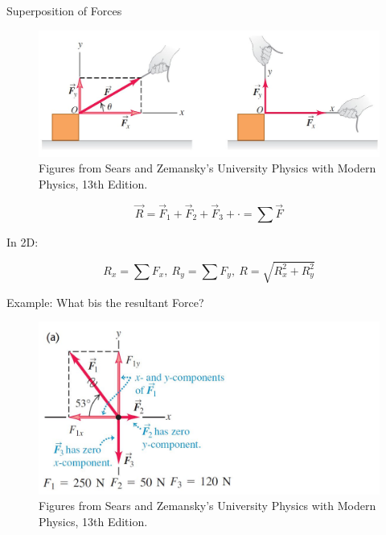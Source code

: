 \documentclass[]{beamer}
\begin{document}




\begin{frame}

 Superposition of Forces
   
      
 \begin{figure}[h!]  
  \includegraphics[width=1.\textwidth]{images/f6.jpg}
  \caption{ {\tiny Figures from Sears and Zemansky's University Physics 
  with Modern Physics, 13th Edition.} }
\end{figure}


  
    \begin{equation}
      \vec{R}=\vec{F}_1+\vec{F}_2+\vec{F}_3+\cdot=\sum \vec{F}
    \end{equation}
    
      \pause
   In 2D:
   
   \begin{equation}
    R_x=\sum F_x,~R_y=\sum F_y,~R=\sqrt{R^2_x+R^2_y}
   \end{equation}
      
      \end{frame}
  



\begin{frame}

  Example: What bis the resultant Force?
    
       
  \begin{figure}[h!]  
   \includegraphics[width=1.\textwidth]{images/f7.jpg}
   \caption{ {\tiny Figures from Sears and Zemansky's University Physics 
   with Modern Physics, 13th Edition.} }
 \end{figure}
 
 
   

       
       \end{frame}
   
\end{document}
